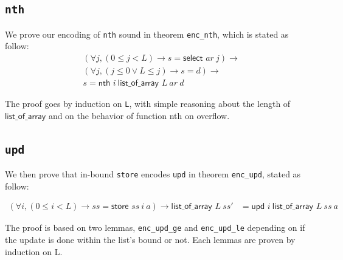 \documentclass[onecolumn, preprint]{sigplanconf}
\newcommand{\select}[2]{\textsf{select } #1\ #2}
\newcommand{\store}[3]{\textsf{store } #1\ #2\ #3}
\newcommand{\loa}[2]{\textsf{list\_of\_array } #1\ #2}
\newcommand{\nth}[3]{\textsf{nth } #1\ #2\ #3}
\newcommand{\unth}[3]{\textsf{upd } #1\ #2\ #3}
\newcommand{\codeinl}[1]{\texttt{#1}}
\begin{document}

\subsection{\texttt{nth}}
We prove our encoding of \texttt{nth} sound in theorem \texttt{enc\_nth}, which is stated as follow:
\begin{align*}
 & (\forall j, (0 \leq j < L) \to s = \select{ar}{j}) \to \\
 & (\forall j, (j \leq 0 \vee L \leq j) \to s = d) \to \\
 & s = \nth{i}{\loa{L}{ar}}{d} 
\end{align*}

The proof goes by induction on \codeinl{L}, with simple reasoning about the length of $\textsf{list\_of\_array}$ and on the behavior of function \textsf{nth} on overflow.

\subsection{\texttt{upd}}
We then prove that in-bound \texttt{store} encodes \texttt{upd} in theorem \texttt{enc\_upd}, stated as follow:

\begin{align*}
  (\forall i, (0 \leq i < L) \to ss = \store{ss}{i}{a}) \to 
     \loa{L}{ss'} &= \unth{i}{\loa{L}{ss}}{a}
\end{align*}

The proof is based on two lemmas, \texttt{enc\_upd\_ge} and \texttt{enc\_upd\_le} depending on if the update is done within the list's bound or not. Each lemmas are proven by induction on L.

\end{document}

